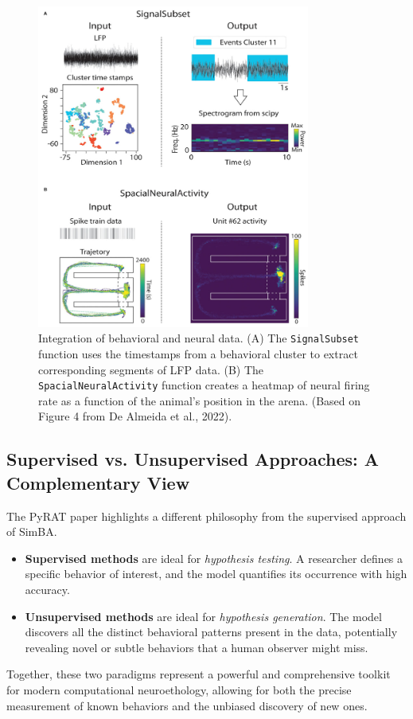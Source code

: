 \begin{figure}[H]
    \centering
    \includegraphics[width=0.8\textwidth]{archivos/figuras/pyrat_4.jpg} 
    \caption{Integration of behavioral and neural data. (A) The \texttt{SignalSubset} function uses the timestamps from a behavioral cluster to extract corresponding segments of LFP data. (B) The \texttt{SpacialNeuralActivity} function creates a heatmap of neural firing rate as a function of the animal's position in the arena. (Based on Figure 4 from De Almeida et al., 2022).}
    \label{fig:neural_integration}
\end{figure}

\subsection{Supervised vs. Unsupervised Approaches: A Complementary View}
The PyRAT paper highlights a different philosophy from the supervised approach of SimBA.
\begin{itemize}
    \item \textbf{Supervised methods} are ideal for \textit{hypothesis testing}. A researcher defines a specific behavior of interest, and the model quantifies its occurrence with high accuracy.
    \item \textbf{Unsupervised methods} are ideal for \textit{hypothesis generation}. The model discovers all the distinct behavioral patterns present in the data, potentially revealing novel or subtle behaviors that a human observer might miss.
\end{itemize}
Together, these two paradigms represent a powerful and comprehensive toolkit for modern computational neuroethology, allowing for both the precise measurement of known behaviors and the unbiased discovery of new ones.

